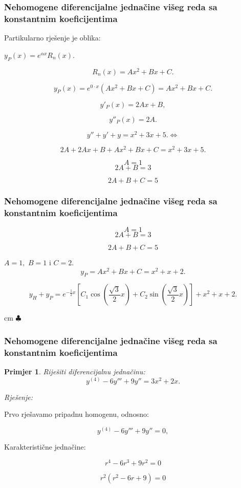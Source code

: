 \documentclass{beamer}
\newtheorem{pri}{\textrm{Primjer}}[section]
\begin{document}
\begin{frame}
\frametitle{Nehomogene diferencijalne jednačine višeg reda sa konstantnim koeficijentima} 

Partikularno rješenje je oblika:

$y_{P}(x) = e^{\alpha x}R_{n}(x). $

$$R_{n}(x) = Ax^{2} + Bx + C.  $$

$$y_{P}(x) =  e^{0 \cdot x}(Ax^{2} + Bx + C) = Ax^{2} + Bx + C. $$

$$y'_{P}(x) = 2Ax + B, $$

$$y''_{P}(x) = 2A .$$

$$y'' + y' + y = x^2 + 3x +5. \Longleftrightarrow$$

$$2A + 2Ax + B  + Ax^{2} + Bx + C = x^2 + 3x +5 .$$

$$A = 1$$
$$2A + B = 3$$

$$2A + B + C = 5$$
\end{frame}
\begin{frame}
\frametitle{Nehomogene diferencijalne jednačine višeg reda sa konstantnim koeficijentima} 
$$A = 1$$
$$2A + B = 3$$

$$2A + B + C = 5$$

$A = 1, $ $B = 1 $ i $C = 2.$ \\

$$ y_{P } = Ax^{2} + Bx + C = x^{2} + x + 2. $$

$$y_{H} + y_{P} =  e^{-\frac{1}{2}x}\left[C_{1}\cos{\left(\frac{\sqrt{3}}{2} x \right) } + C_{2}\sin{\left(\frac{\sqrt{3}}{2} x\right)}\right] + x^{2} + x + 2. $$

  cm $\clubsuit$ \\
 
 
 
\end{frame}
\begin{frame}
\frametitle{Nehomogene diferencijalne jednačine višeg reda sa konstantnim koeficijentima}
 \begin{pri}
 Riješiti diferencijalnu jednačinu:
$$y^{(4)} - 6y''' + 9y'' = 3x^{2} + 2x.$$
 \end{pri}
\emph{Rješenje:}


Prvo rješavamo pripadnu homogenu, odnosno:

$$y^{(4)} - 6y''' + 9y'' = 0, $$

Karakteristične jednačine:

$$r^{4} - 6r^{3} + 9r^{2} = 0$$

$$r^{2} (r^{2} - 6r + 9) = 0$$



\end{frame}
\end{document}
